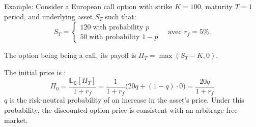 Example:
Consider a European call option with strike $K = 100$, maturity $T = 1$ period, and underlying asset $S_T$ such that:
$$
S_T = 
\begin{cases}
120 \; \text{with probability } p \\
50 \; \text{with probability } 1-p
\end{cases} \quad  \text{avec } r_f = 5\%.
$$

The option being being a call, its payoff is $\Pi_T = \max(S_T - K, 0)$.  

The initial price is :
$$ \Pi_0 = \frac{\mathbb{E}_{\mathbb{Q}}[\Pi_T]}{1+r_f} = \frac{1}{1+r_f} \big(20q + (1-q) \cdot 0 \big) = \frac{20q}{1 + r_f} $$
$q$ is the risk-neutral probability of an increase in the asset's price.
Under this probability, the discounted option price is consistent with an arbitrage-free market.